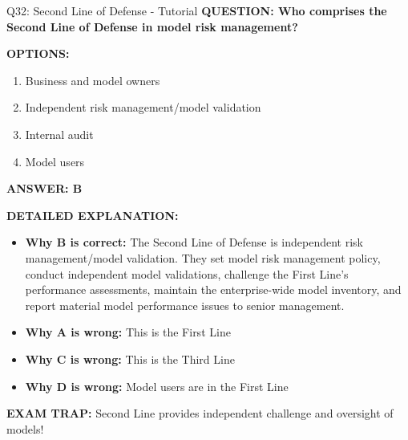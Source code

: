 \documentclass[8pt]{beamer}
\begin{document}
	\begin{frame}{Q32: Second Line of Defense - Tutorial}
		\fontsize{6.5}{7.5}\selectfont
		\textbf{QUESTION: Who comprises the Second Line of Defense in model risk management?}
		
		\vspace{0.1cm}
		\textbf{OPTIONS:}
		\begin{enumerate}
			\item Business and model owners
			\item Independent risk management/model validation
			\item Internal audit
			\item Model users
		\end{enumerate}
		
		\vspace{0.1cm}
		\textcolor{myblue}{\textbf{ANSWER: B}}
		
		\vspace{0.1cm}
		\textbf{DETAILED EXPLANATION:}
		\begin{itemize}
			\item \textbf{Why B is correct:} The Second Line of Defense is independent risk management/model validation. They set model risk management policy, conduct independent model validations, challenge the First Line's performance assessments, maintain the enterprise-wide model inventory, and report material model performance issues to senior management.
			\item \textbf{Why A is wrong:} This is the First Line
			\item \textbf{Why C is wrong:} This is the Third Line
			\item \textbf{Why D is wrong:} Model users are in the First Line
		\end{itemize}
		
		\textcolor{myred}{\textbf{EXAM TRAP:}} Second Line provides \textcolor{myblue}{independent challenge and oversight} of models!
	\end{frame}
	
\end{document}

